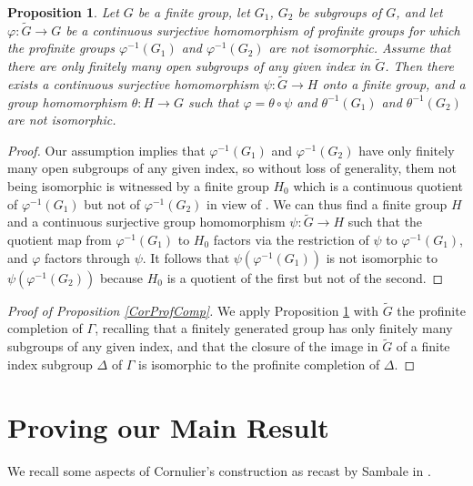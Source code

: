 \documentclass[11pt]{amsart}
\newtheorem{prop}[thm]{Proposition}
\numberwithin{equation}{section}
\begin{document}
\begin{prop} \label{SmallGroupProp}
Let $G$ be a finite group, let $G_1$, $G_2$ be subgroups of $G$, and let $\varphi \colon \widetilde G \to G$ be a continuous surjective homomorphism of profinite groups for which the profinite groups $\varphi^{-1}(G_1)$ and $\varphi^{-1}(G_2)$ are not isomorphic. Assume that there are only finitely many open subgroups of any given index in $\widetilde G$. Then there exists a continuous surjective homomorphism $\psi \colon \widetilde G \to H$ onto a finite group, and a group homomorphism $\theta \colon H \to G$ such that $\varphi = \theta \circ \psi$ and $\theta^{-1}(G_1)$ and $\theta^{-1}(G_2)$ are not isomorphic.
\end{prop}

\begin{proof}
Our assumption implies that $\varphi^{-1}(G_1)$ and $\varphi^{-1}(G_2)$ have only finitely many open subgroups of any given index, so without loss of generality, them not being isomorphic is witnessed by a finite group $H_0$ which is a continuous quotient of $\varphi^{-1}(G_1)$ but not of $\varphi^{-1}(G_2)$ in view of \cite[Theorem 4.2.4]{Wilson}. We can thus find a finite group $H$ and a continuous surjective group homomorphism $\psi \colon \widetilde G \to H$ such that the quotient map from $\varphi^{-1}(G_1)$ to $H_0$ factors via the restriction of $\psi$ to $\varphi^{-1}(G_1)$, and $\varphi$ factors through $\psi$. It follows that $\psi(\varphi^{-1}(G_1))$ is not isomorphic to $\psi(\varphi^{-1}( G_2))$ because $H_0$ is a quotient of the first but not of the second.
\end{proof}

\begin{proof}[Proof of Proposition \ref{CorProfComp}]

We apply Proposition \ref{SmallGroupProp} with $\widetilde G$ the profinite completion of $\Gamma$, recalling that a finitely generated group has only finitely many subgroups of any given index, and that the closure of the image in $\widetilde G$ of a finite index subgroup $\Delta$ of $\Gamma$ is isomorphic to the profinite completion of $\Delta$.
\end{proof}

\section{Proving our Main Result}

We recall some aspects of Cornulier's construction as recast by Sambale in \cite{group-theoretic-cornulier}.
\end{document}
